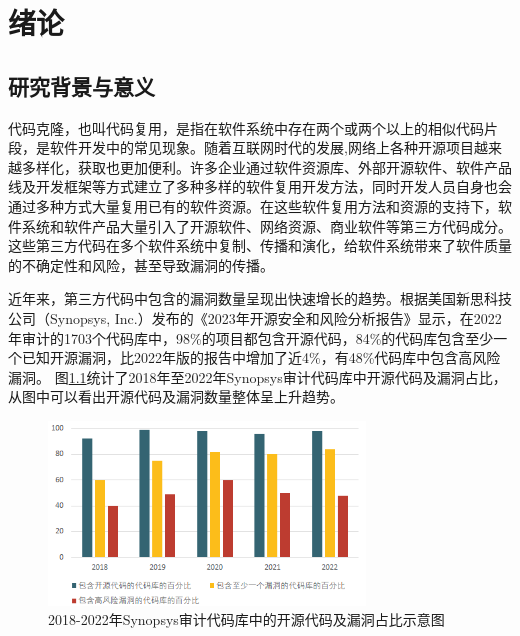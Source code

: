 %
%
%
%

\chapter{绪论}

\label{chap:intro}
\section{研究背景与意义}

代码克隆，也叫代码复用，是指在软件系统中存在两个或两个以上的相似代码片段\cite{乐乔艺2021代码克隆检测研究进展综述}，是软件开发中的常见现象。随着互联网时代的发展,网络上各种开源项目越来越多样化，获取也更加便利。许多企业通过软件资源库、外部开源软件、软件产品线及开发框架等方式建立了多种多样的软件复用开发方法，同时开发人员自身也会通过多种方式大量复用已有的软件资源。在这些软件复用方法和资源的支持下，软件系统和软件产品大量引入了开源软件、网络资源、商业软件等第三方代码成分。这些第三方代码在多个软件系统中复制、传播和演化，给软件系统带来了软件质量的不确定性和风险，甚至导致漏洞的传播。

近年来，第三方代码中包含的漏洞数量呈现出快速增长的趋势。根据美国新思科技公司（Synopsys, Inc.）发布的《2023年开源安全和风险分析报告》\cite{Synopsys_2023}显示，在2022年审计的1703个代码库中，98\%的项目都包含开源代码，84\%的代码库包含至少一个已知开源漏洞，比2022年版的报告中增加了近4\%，有48\%代码库中包含高风险漏洞。
图\ref{fig:Proportion}统计了2018年至2022年Synopsys审计代码库中开源代码及漏洞占比，从图中可以看出开源代码及漏洞数量整体呈上升趋势。
\begin{figure}[H]
    \centering
    \includegraphics[width=0.75\textwidth]{figures/Proportion}
    \caption{2018-2022年Synopsys审计代码库中的开源代码及漏洞占比示意图}\label{fig:Proportion}
\end{figure}

